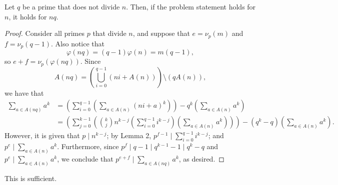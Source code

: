 \begin{boxlemma}
    Let $q$ be a prime that does not divide $n$. Then, if the problem statement holds for $n$, it holds for $nq$.
\end{boxlemma}
\begin{proof}
    Consider all primes $p$ that divide $n$, and suppose that $e=\nu_p(m)$ and $f=\nu_p(q-1)$. Also notice that \[\varphi(nq)=(q-1)\varphi(n)=m(q-1),\]
    so $e+f=\nu_p(\varphi(nq))$. Since \[A(nq)=\left(\bigcup_{i=0}^{q-1}(ni+A(n))\right)\setminus(qA(n)),\]
    we have that
    \begin{align*}
        \sum_{a\in A(nq)}a^k&=\left(\sum_{i=0}^{q-1}\left(\sum_{a\in A(n)}(ni+a)^k\right)\right)-q^k\left(\sum_{a\in A(n)}a^k\right)\\
        &=\left(\sum_{j=0}^{k-1}\left(\binom kj n^{k-j}\left(\sum_{i=0}^{q-1}i^{k-j}\right)\left(\sum_{a\in A(n)}a^k\right)\right)\right)-(q^k-q)\left(\sum_{a\in A(n)}a^k\right).
    \end{align*}
    However, it is given that $p\mid n^{k-j}$; by Lemma 2, $p^{f-1}\mid\sum_{i=0}^{q-1} i^{k-j}$; and $p^e\mid\sum_{a\in A(n)}a^k$. Furthermore, since $p^f\mid q-1\mid q^{k-1}-1\mid q^k-q$ and $p^e\mid\sum_{a\in A(n)}a^k$, we conclude that $p^{e+f}\mid\sum_{a\in A(nq)}a^k$, as desired.
\end{proof}

This is sufficient.
